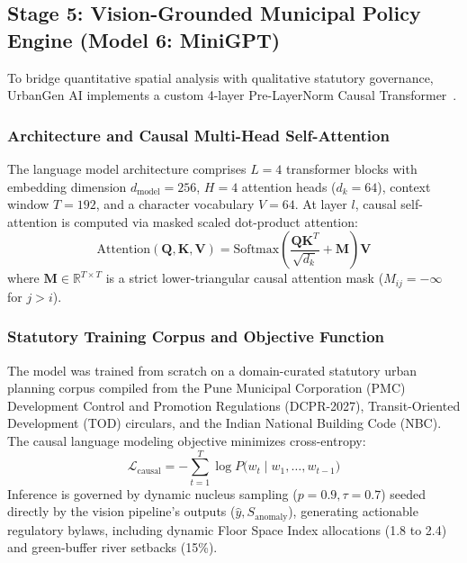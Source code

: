 \documentclass[journal]{IEEEtran}
\begin{document}
\subsection{Stage 5: Vision-Grounded Municipal Policy Engine (Model 6: MiniGPT)}
To bridge quantitative spatial analysis with qualitative statutory governance, UrbanGen AI implements a custom 4-layer Pre-LayerNorm Causal Transformer~\cite{vaswani2017attention,radford2019language}.

\subsubsection{Architecture and Causal Multi-Head Self-Attention}
The language model architecture comprises $L=4$ transformer blocks with embedding dimension $d_{\text{model}} = 256$, $H=4$ attention heads ($d_k = 64$), context window $T=192$, and a character vocabulary $V=64$. At layer $l$, causal self-attention is computed via masked scaled dot-product attention:
\begin{equation}
\text{Attention}(\mathbf{Q}, \mathbf{K}, \mathbf{V}) = \text{Softmax}\left(\frac{\mathbf{Q}\mathbf{K}^T}{\sqrt{d_k}} + \mathbf{M}\right)\mathbf{V}
\label{eq:causal_attn}
\end{equation}
where $\mathbf{M} \in \mathbb{R}^{T \times T}$ is a strict lower-triangular causal attention mask ($M_{ij} = -\infty$ for $j > i$).

\subsubsection{Statutory Training Corpus and Objective Function}
The model was trained from scratch on a domain-curated statutory urban planning corpus compiled from the Pune Municipal Corporation (PMC) Development Control and Promotion Regulations (DCPR-2027), Transit-Oriented Development (TOD) circulars, and the Indian National Building Code (NBC). The causal language modeling objective minimizes cross-entropy:
\begin{equation}
\mathcal{L}_{\text{causal}} = - \sum_{t=1}^T \log P\big(w_t \mid w_1, \dots, w_{t-1}\big)
\label{eq:lm_loss}
\end{equation}
Inference is governed by dynamic nucleus sampling ($p = 0.9, \tau = 0.7$) seeded directly by the vision pipeline's outputs ($\hat{y}, S_{\text{anomaly}}$), generating actionable regulatory bylaws, including dynamic Floor Space Index allocations (1.8 to 2.4) and green-buffer river setbacks (15\%).
\end{document}

